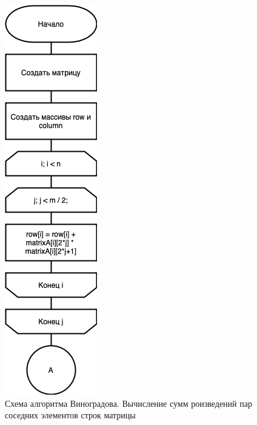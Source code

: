 \begin{figure}[h]
    \centering
    \includegraphics[width=0.3\linewidth]{img/WinogradPrA.jpg}
    \caption{Схема алгоритма Виноградова. Вычисление сумм роизведений 
    пар соседних элементов строк матрицы}
    \label{fig:mpr}
\end{figure}

